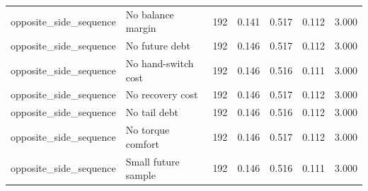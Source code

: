 \begin{table}[t]
\begin{tabular}{llrrrrr}
opposite\_side\_sequence & No balance margin & 192 & 0.141 & 0.517 & 0.112 & 3.000 \\
opposite\_side\_sequence & No future debt & 192 & 0.146 & 0.517 & 0.112 & 3.000 \\
opposite\_side\_sequence & No hand-switch cost & 192 & 0.146 & 0.516 & 0.111 & 3.000 \\
opposite\_side\_sequence & No recovery cost & 192 & 0.146 & 0.517 & 0.112 & 3.000 \\
opposite\_side\_sequence & No tail debt & 192 & 0.146 & 0.516 & 0.112 & 3.000 \\
opposite\_side\_sequence & No torque comfort & 192 & 0.146 & 0.517 & 0.112 & 3.000 \\
opposite\_side\_sequence & Small future sample & 192 & 0.146 & 0.516 & 0.111 & 3.000 \\
\bottomrule
\end{tabular}
\end{table}
